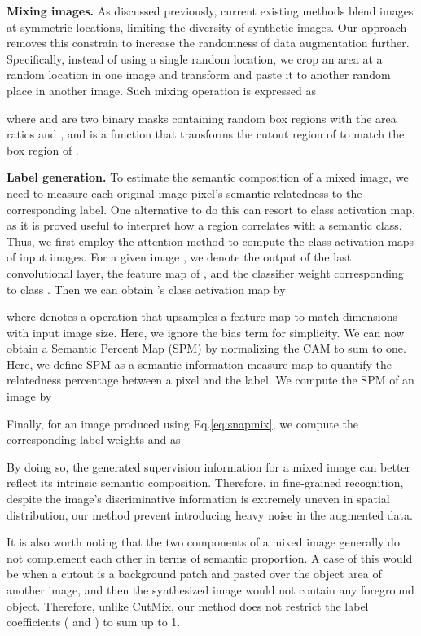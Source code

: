\documentclass[letterpaper]{article} \usepackage{aaai21}  \usepackage{times}  \usepackage{helvet} \usepackage{courier}  \usepackage[hyphens]{url}  \usepackage{graphicx} \urlstyle{rm} \def\UrlFont{\rm}  \usepackage{natbib}  \usepackage{caption} \frenchspacing  \setlength{\pdfpagewidth}{8.5in}  \setlength{\pdfpageheight}{11in}
\begin{document}
\textbf{Mixing images.} As discussed previously, current existing methods blend images at symmetric locations, limiting the diversity of synthetic images. Our approach removes this constrain to increase the randomness of data augmentation further. Specifically, instead of using a single random location, we crop an area at a random location in one image and transform and paste it to another random place in another image. Such mixing operation is expressed as



 where  and  are two binary masks containing random box regions with the area ratios  and , and  is a function that transforms the cutout region of  to match the box region of .
 
 
\textbf{Label generation.}
To estimate the semantic composition of a mixed image, we need to measure each original image pixel's semantic relatedness to the corresponding label. One alternative to do this can resort to class activation map,  as it is proved useful to interpret how a region correlates with a semantic class. Thus, we first employ the attention method\cite{zhou2016learning} to compute the class activation maps of input images. For a given image , we denote  the output of the last convolutional layer,   the  feature map of , and  the classifier weight corresponding to class . Then we can obtain 's class activation map  by 


where  denotes a operation that upsamples a feature map to match dimensions with input image size. Here, we ignore the bias term for simplicity.
We can now obtain a Semantic Percent Map (SPM) by normalizing the CAM to sum to one. Here, we define SPM as a semantic information measure map to quantify the relatedness percentage between a pixel and the label.  We compute the SPM of an image  by



Finally, for an image  produced using Eq.\ref{eq:snapmix}, we compute the corresponding label weights  and  as


By doing so,  the generated supervision information for a mixed image can better reflect its intrinsic semantic composition. Therefore, in fine-grained recognition, despite the image's discriminative information is extremely uneven in spatial distribution, our method prevent introducing heavy noise in the augmented data.

It is also worth noting that the two components of a mixed image generally do not complement each other in terms of semantic proportion.  A case of this would be when a cutout is a background patch and pasted over the object area of another image, and then the synthesized image would not contain any foreground object. Therefore, unlike CutMix, our method does not restrict the label coefficients ( and  )  to sum up to 1.  
\end{document}
